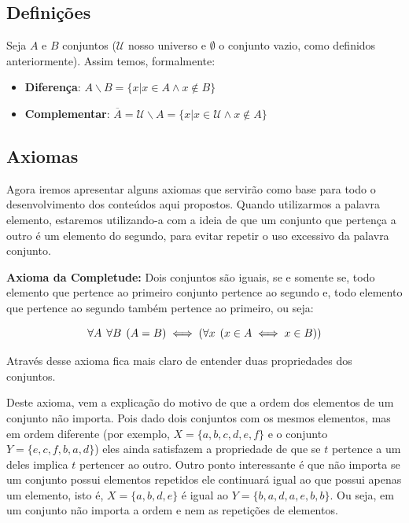   \subsection{Definições}
  Seja $A$ e $B$ conjuntos ($\mathcal{U}$ nosso universo e $\emptyset$ o conjunto vazio, como definidos anteriormente). Assim temos, formalmente:

  \begin{itemize}
    \item \textbf{Diferença}: $A \backslash B = \{x | x \in A \land x \notin B\}$
  
    \item \textbf{Complementar}: $\overline A = \mathcal{U} \backslash A = \{x | x \in \mathcal{U} \land x \notin A\}$
  \end{itemize} 

  \subsection{Axiomas}
  Agora iremos apresentar alguns axiomas que servirão como base para todo o desenvolvimento dos conteúdos aqui propostos. Quando utilizarmos a palavra elemento, estaremos utilizando-a com a ideia de que um conjunto que pertença a outro é um elemento do segundo, para evitar repetir o uso excessivo da palavra conjunto.
  
  \textbf{Axioma da Completude:} Dois conjuntos são iguais, se e somente se, todo elemento que pertence ao primeiro conjunto pertence ao segundo e, todo elemento que pertence ao segundo também pertence ao primeiro, ou seja:
  
  \[\forall A \hspace{1.5mm} \forall B \hspace{1.5mm} (A = B) \iff (\forall x \hspace{1.5mm} (x \in A \iff x \in B))\] 
  
  Através desse axioma fica mais claro de entender duas propriedades dos conjuntos. 
  
  Deste axioma, vem a explicação do motivo de que a ordem dos elementos de um conjunto não importa. Pois dado dois conjuntos com os mesmos elementos, mas em ordem diferente (por exemplo, $X=\{a,b,c,d,e,f\}$ e o conjunto $Y=\{e,c,f,b,a,d\}$) eles ainda satisfazem a propriedade de que se $t$ pertence a um deles implica $t$ pertencer ao outro. Outro ponto interessante é que não importa se um conjunto possui elementos repetidos ele continuará igual ao que possui apenas um elemento, isto é, $X=\{a,b,d,e\}$ é igual ao $Y=\{b,a,d,a,e,b,b\}$. Ou seja, em um conjunto não importa a ordem e nem as repetições de elementos.
  
